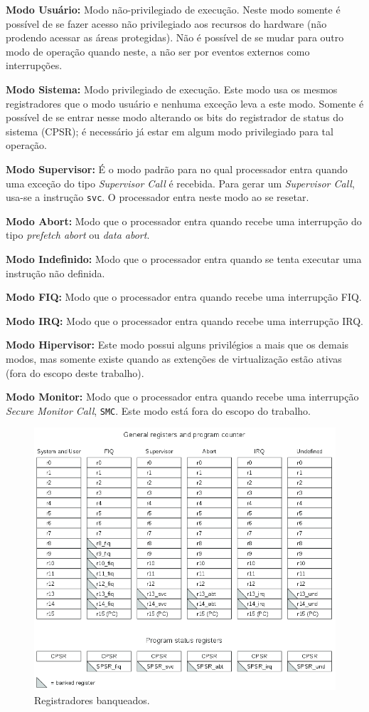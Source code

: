 \textbf{Modo Usuário:} Modo não-privilegiado de execução. Neste modo somente é possível de se fazer acesso não privilegiado aos recursos do hardware (não prodendo acessar as áreas protegidas). Não é possível de se mudar para outro modo de operação quando neste, a não ser por eventos externos como interrupções.

\textbf{Modo Sistema:} Modo privilegiado de execução. Este modo usa os mesmos registradores que o modo usuário e nenhuma exceção leva a este modo. Somente é possível de se entrar nesse modo alterando os bits do registrador de status do sistema (CPSR); é necessário já estar em algum modo privilegiado para tal operação.

\textbf{Modo Supervisor:} É o modo padrão para no qual processador entra quando uma exceção do tipo \emph{Supervisor Call} é recebida.
Para gerar um \emph{Supervisor Call}, usa-se a instrução \verb+svc+. O processador entra neste modo ao se resetar.

\textbf{Modo Abort:} Modo que o processador entra quando recebe uma interrupção do tipo \emph{prefetch abort} ou \emph{data abort}.

\textbf{Modo Indefinido:} Modo que o processador entra quando se tenta executar uma instrução não definida.

\textbf{Modo FIQ:} Modo que o processador entra quando recebe uma interrupção FIQ.

\textbf{Modo IRQ:} Modo que o processador entra quando recebe uma interrupção IRQ.

\textbf{Modo Hipervisor:} Este modo possui alguns privilégios a mais que os demais modos, mas somente existe quando as extenções de virtualização estão ativas (fora do escopo deste trabalho).

\textbf{Modo Monitor:} Modo que o processador entra quando recebe uma interrupção \emph{Secure Monitor Call}, \verb+SMC+. Este modo está fora do escopo do trabalho.


\begin{figure}[ht!]
	\centerline{
    \includegraphics[width=12cm]{figuras/banked_registers}
	}
    \caption{Registradores banqueados.}
	\label{fig:banked}
\end{figure}



